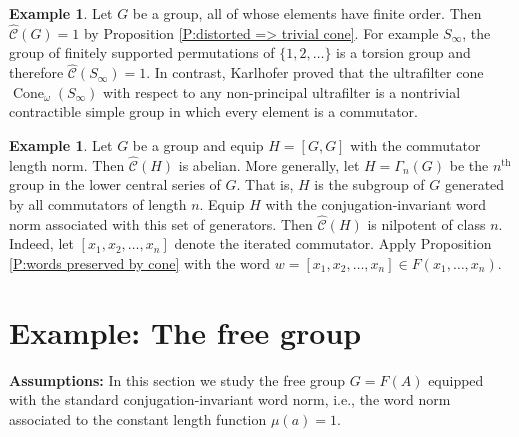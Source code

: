 \documentclass[12pt]{amsart}
\theoremstyle{definition}
\newtheorem{example}[prop]{Example}
\newcommand{\OP}[1]{\operatorname{#1}}
\def\Free{F}
\def\tC{\hat{\mathcal{C}}}
\begin{document}
\begin{example}\label{E:symmetric8}
Let $G$ be a group, all of whose elements have finite order.
Then $\tC(G)=1$ by Proposition \ref{P:distorted => trivial cone}.
For example $S_\infty$, the group of finitely supported permutations of $\{1,2,\dots\}$ is a torsion group and therefore $\tC(S_{\infty})=1$.
In contrast, Karlhofer \cite{2203.10889} proved that the ultrafilter cone $\OP{Cone}_{\omega}(S_{\infty})$ with respect to any non-principal ultrafilter is a nontrivial contractible simple group in which every element is a commutator.
\end{example}







\begin{example}\label{example:commutator length abelian}
Let $G$ be a group and equip $H=[G,G]$ with the commutator length norm.
Then $\tC(H)$ is abelian.
More generally, let $H=\Gamma_n(G)$ be the $n^{\text{th}}$ group in the lower central series of $G$.
That is, $H$ is the subgroup of $G$ generated by all commutators of length $n$.
Equip $H$ with the conjugation-invariant word norm associated with this set of generators.
Then $\tC(H)$ is nilpotent of class $n$.
Indeed,
let $[x_1,x_2,\dots,x_n]$ denote the iterated commutator.
Apply Proposition \ref{P:words preserved by cone} with the word $w=[x_1,x_2,\dots,x_n] \in \Free(x_1,\dots,x_n)$.
\end{example}





















\section{Example: The free group}\label{S:coneFn}

{\bf Assumptions:}
In this section we study the free group $G=\Free(A)$  equipped with the standard conjugation-invariant word norm, i.e., the word norm associated to the constant length function $\mu(a)=1$.
\end{document}
